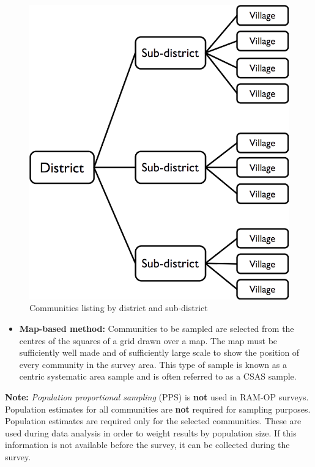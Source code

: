 \documentclass[12pt,a4paper]{book}
\providecommand{\tightlist}{%
  \setlength{\itemsep}{0pt}\setlength{\parskip}{0pt}}
\theoremstyle{definition}
\theoremstyle{definition}
\theoremstyle{definition}
\theoremstyle{remark}
\begin{document}
\begin{figure}[H]

{\centering \includegraphics[width=800pt]{figures/listSample1} 

}

\caption{Communities listing by district and sub-district}\label{fig:sample1}
\end{figure}

\begin{itemize}
\tightlist
\item
  \textbf{Map-based method:} Communities to be sampled are selected from
  the centres of the squares of a grid drawn over a map. The map must be
  sufficiently well made and of sufficiently large scale to show the
  position of every community in the survey area. This type of sample is
  known as a centric systematic area sample and is often referred to as
  a CSAS sample.
\end{itemize}

\textbf{Note:} \emph{Population proportional sampling} (PPS) is
\textbf{not} used in RAM-OP surveys. Population estimates for all
communities are \textbf{not} required for sampling purposes. Population
estimates are required only for the selected communities. These are used
during data analysis in order to weight results by population size. If
this information is not available before the survey, it can be collected
during the survey.
\end{document}
